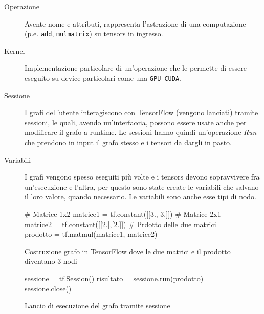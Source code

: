 \documentclass[DIV=calc, paper=a4, fontsize=11pt]{scrartcl}	 %
\begin{document}
\begin{multicols}{2}
			\begin{description}
				\item[Operazione] Avente nome e attributi, rappresenta l'astrazione di una computazione (p.e. \texttt{add}, \texttt{mulmatrix}) su tensors in ingresso.
				\item[Kernel] Implementazione particolare di un'operazione che le permette di essere eseguito su device particolari come una \texttt{GPU CUDA}.
				\item[Sessione] I grafi dell'utente interagiscono con TensorFlow (vengono lanciati) tramite sessioni, le quali, avendo un'interfaccia, possono essere usate anche per modificare il grafo a runtime. Le sessioni hanno quindi un'operazione \textit{Run} che prendono in input il grafo stesso e i tensori da dargli in pasto.
				\item[Variabili] I grafi vengono spesso eseguiti più volte e i tensors devono sopravvivere fra un'esecuzione e l'altra, per questo sono state create le variabili che salvano il loro valore, quando necessario. Le variabili sono anche esse tipi di nodo.
			\end{description}
		
			\begin{figure*}
				\begin{python}
# Matrice 1x2
matrice1 = tf.constant([[3., 3.]])
# Matrice 2x1
matrice2 = tf.constant([[2.],[2.]])
# Prdotto delle due matrici
prodotto = tf.matmul(matrice1, matrice2)
				\end{python}
				\caption{Costruzione grafo in TensorFlow dove le due matrici e il prodotto diventano 3 nodi}
				\label{py:costruzione}
			\end{figure*}
		
			\begin{figure*}
				\centering
				\begin{python}
sessione = tf.Session()
risultato = sessione.run(prodotto)
sessione.close()
				\end{python}
				\caption{Lancio di esecuzione del grafo tramite sessione}
				\label{py:lancio}
			\end{figure*}
		

\end{multicols}
\end{document}
